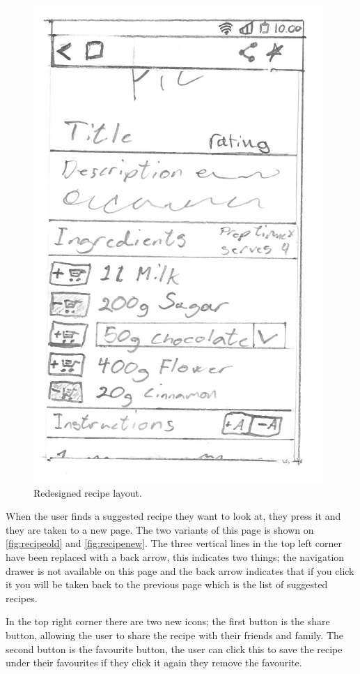 \begin{figure}[H]
\begin{minipage}[t]{0.5\columnwidth}
\centering
\includegraphics[width=0.735\columnwidth]{img/prototypes/recipe_new.pdf}
\caption{Redesigned recipe layout\label{fig:recipenew}.}
\end{minipage}
\end{figure}

When the user finds a suggested recipe they want to look at, they press it and they are taken to a new page. The two variants of this page is shown on \autoref{fig:recipeold} and \autoref{fig:recipenew}. The three vertical lines in the top left corner have been replaced with a back arrow, this indicates two things; the navigation drawer is not available on this page and the back arrow indicates that if you click it you will be taken back to the previous page which is the list of suggested recipes.

In the top right corner there are two new icons; the first button is the share button, allowing the user to share the recipe with their friends and family. The second button is the favourite button, the user can click this to save the recipe under their favourites if they click it again they remove the favourite.

